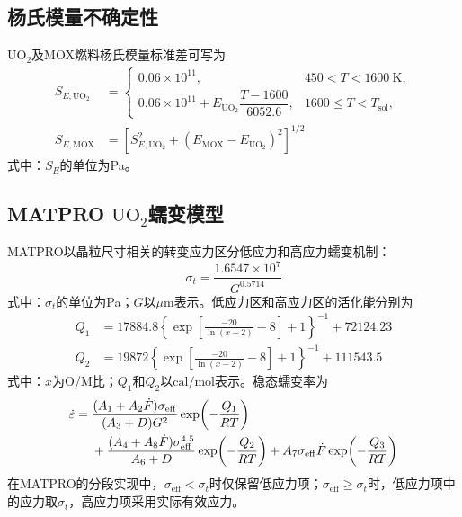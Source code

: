 \subsection{杨氏模量不确定性}

$\mathrm{UO}_2$及MOX燃料杨氏模量标准差可写为
\begin{equation}
	\begin{aligned}
		S_{E,\mathrm{UO}_2}
		&=
		\begin{cases}
			0.06\times10^{11},
			&450<T<1600\ \mathrm{K},\\
			0.06\times10^{11}
			+E_{\mathrm{UO}_2}\dfrac{T-1600}{6052.6},
			&1600\leq T<T_{\mathrm{sol}},
		\end{cases}\\[0.5ex]
		S_{E,\mathrm{MOX}}
		&=
		\left[
		S_{E,\mathrm{UO}_2}^{2}
		+\left(E_{\mathrm{MOX}}-E_{\mathrm{UO}_2}\right)^2
		\right]^{1/2}
	\end{aligned}
	\label{eq:appendix_uo2_youngs_modulus_uncertainty}
\end{equation}
\label{eq:appendix_mox_youngs_modulus_uncertainty}
\noindent 式中：$S_E$的单位为Pa。

\subsection{MATPRO $\mathrm{UO}_2$蠕变模型}

MATPRO以晶粒尺寸相关的转变应力区分低应力和高应力蠕变机制：
\begin{equation}
	\sigma_t=\frac{1.6547\times10^7}{G^{0.5714}}
	\label{eq:appendix_uo2_transition_stress}
\end{equation}
\noindent 式中：$\sigma_t$的单位为Pa；$G$以$\mu\mathrm{m}$表示。低应力区和高应力区的活化能分别为
\begin{equation}
	\begin{aligned}
		Q_1&=17884.8
				\left\{
				\exp\!\left[\frac{-20}{\ln(x-2)}-8\right]+1
				\right\}^{-1}
				+72124.23
				\\
				Q_2&=19872
				\left\{
				\exp\!\left[\frac{-20}{\ln(x-2)}-8\right]+1
				\right\}^{-1}
				+111543.5
	\end{aligned}
	\label{eq:appendix_uo2_activation_energies}
\end{equation}
\label{eq:appendix_uo2_Q1}
\label{eq:appendix_uo2_Q2}
\noindent 式中：$x$为O/M比；$Q_1$和$Q_2$以$\mathrm{cal/mol}$表示。稳态蠕变率为
\begin{align}
	\dot{\varepsilon}={}&
	\frac{(A_1+A_2\dot{F})\sigma_{\mathrm{eff}}}
	{(A_3+D)G^2}
	\exp\!\left(-\frac{Q_1}{RT}\right)
	\notag\\
	&+\frac{(A_4+A_8\dot{F})\sigma_{\mathrm{eff}}^{4.5}}
	{A_6+D}
	\exp\!\left(-\frac{Q_2}{RT}\right)
	+A_7\sigma_{\mathrm{eff}}\dot{F}
	\exp\!\left(-\frac{Q_3}{RT}\right)
	\label{eq:appendix_uo2_matpro_creep}
\end{align}
在MATPRO的分段实现中，$\sigma_{\mathrm{eff}}<\sigma_t$时仅保留低应力项；$\sigma_{\mathrm{eff}}\geq\sigma_t$时，低应力项中的应力取$\sigma_t$，高应力项采用实际有效应力。

